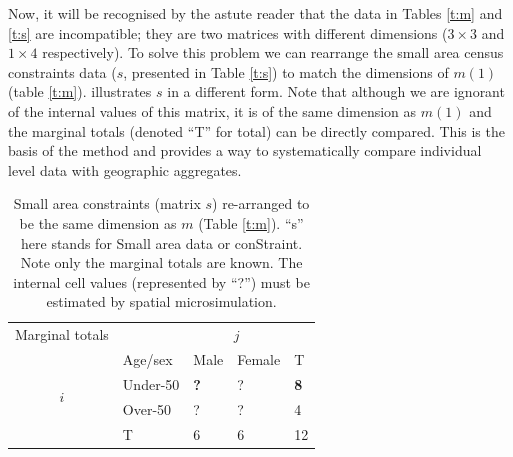 \documentclass[a4paper, 11pt, twoside]{article}
\begin{document}
\begin{table}[H]
\end{table}

Now, it will be recognised by the astute reader that the data in
Tables \ref{t:m} and \ref{t:s} are incompatible; they are
two matrices with different dimensions ($3 \times 3$ and $1 \times 4$ respectively).
To solve this problem we can rearrange the small area census constraints data
($s$, presented in Table \ref{t:s}) to match the dimensions of
$m(1)$ (table \ref{t:m}).
 illustrates $s$ in a different form.
Note that although we are ignorant of the internal values of this matrix,
it is of the same dimension as $m(1)$ and the marginal totals (denoted ``T'' for
total) can be directly compared. This is the basis of the method and provides a
way to systematically compare individual level data with geographic aggregates.

\begin{table}[h]
\centering
\caption[Small area constraints expressed as marginal totals]{Small
area constraints (matrix $s$) re-arranged to be the same dimension as $m$ (Table \ref{t:m}).
``s'' here stands for Small area data or conStraint. Note only
the marginal totals are known. The internal cell
values (represented by ``?'') must be estimated by spatial microsimulation.
}
\begin{tabular}{cllll}\toprule
Marginal totals&  & \multicolumn{2}{c}{$j$} & \\
& Age/sex & Male & Female & T\\ \midrule
\multirow{2}{*}{$i$} & Under-50 & \textbf{?} & ? & \textbf{\color{blue}8}\\
& Over-50 & ? & ? &4 \\
& T & 6 & 6 &12\\
\bottomrule
\end{tabular}
\label{t:s2}
\end{table}
\end{document}
